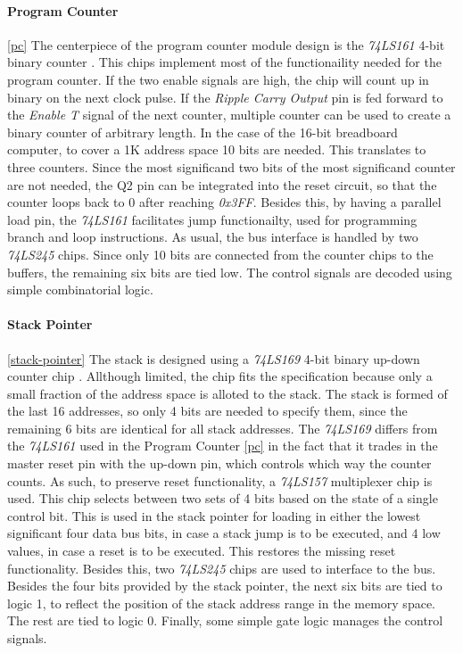 \paragraph{Program Counter} \ref{pc}
The centerpiece of the program counter module design is the \emph{74LS161} 4-bit binary counter \cite{74ls161}. This chips
implement most of the functionaility needed for the program counter. If the two enable signals are high, the chip will count
up in binary on the next clock pulse. If the \emph{Ripple Carry Output} pin is fed forward to the \emph{Enable T} signal of the
next counter, multiple counter can be used to create a binary counter of arbitrary length. In the case of the 16-bit breadboard
computer, to cover a 1K address space 10 bits are needed. This translates to three counters. Since the most significand two bits of
the most significand counter are not needed, the Q2 pin can be integrated into the reset circuit, so that the counter loops back
to 0 after reaching \emph{0x3FF}. Besides this, by having a parallel load pin, the \emph{74LS161}  facilitates jump functionailty,
used for programming branch and loop instructions. As usual, the bus interface is handled by two \emph{74LS245} \cite{74ls245}
chips. Since only 10 bits are connected from the counter chips to the buffers, the remaining six bits are tied low.
The control signals are decoded using simple combinatorial logic.



\paragraph{Stack Pointer} \ref{stack-pointer}
The stack is designed using a \emph{74LS169} 4-bit binary up-down counter chip \cite{74ls169}. Allthough limited,
the chip fits the specification because only a small fraction of the address space is alloted to the stack. The stack is formed
of the last 16 addresses, so only 4 bits are needed to specify them, since the remaining 6 bits are identical for all stack
addresses. The \emph{74LS169} differs from the \emph{74LS161} \cite{74ls161} used in the Program Counter \ref{pc} in the fact that
it trades in the master reset pin with the up-down pin, which controls which way the counter counts. As such, to preserve reset
functionality, a \emph{74LS157} \cite{74ls157} multiplexer chip is used. This chip selects between two sets of 4 bits based on
the state of a single control bit. This is used in the stack pointer for loading in either the lowest significant four data bus
bits, in case a stack jump is to be executed, and 4 low values, in case a reset is to be executed. This restores the missing
reset functionality. Besides this, two \emph{74LS245} \cite{74ls245}  chips are used to interface to the bus. Besides the four
bits provided by the stack pointer, the next six bits are tied to logic 1, to reflect the position of the stack address range in
the memory space. The rest are tied to logic 0. Finally, some simple gate logic manages the control signals.

